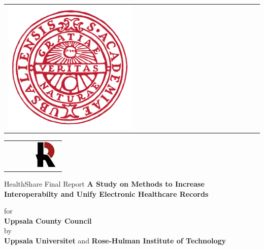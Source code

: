 \begin{titlepage}

\begin{minipage}{4cm}
\begin{tabular}{l}
\includegraphics[width=0.5\textwidth]{Images/uppsala}
\end{tabular}
\end{minipage}
\hfill
\begin{minipage}{4cm}
\begin{tabular}{r}
\includegraphics[width=0.5\textwidth]{Images/logo}
\end{tabular}
\end{minipage}


\begin{center}

\textmd{HealthShare Final Report}
\vfill
 \huge{\textbf{A Study on Methods to Increase Interoperabilty and Unify Electronic Healthcare Records } }\\[2.0cm]
\begin{center}
for\\
\large\textbf{Uppsala County Council}\\[1.0cm]
by\\
\large{\textbf{Uppsala Universitet}} and \large{\textbf{Rose-Hulman Institute of Technology}}\\[1.0cm]


\end{center}
\end{center}
\end{titlepage}

